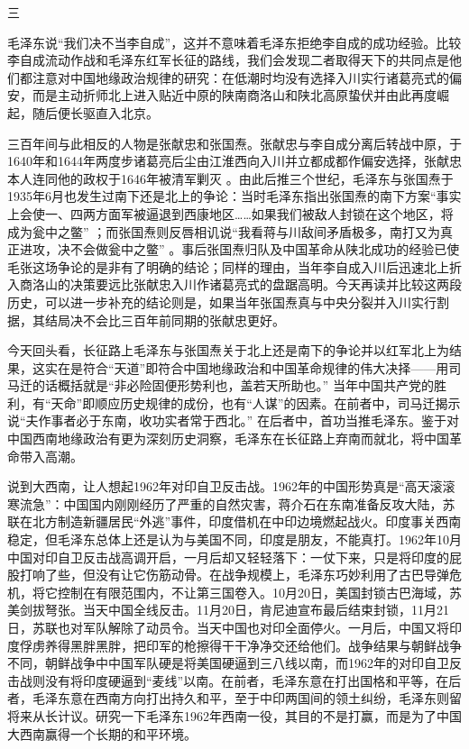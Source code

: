 \documentclass[UTF8, 12pt, a4paper]{ctexrep}
\begin{document}
三

毛泽东说“我们决不当李自成”，这并不意味着毛泽东拒绝李自成的成功经验。比较李自成流动作战和毛泽东红军长征的路线，我们会发现二者取得天下的共同点是他们都注意对中国地缘政治规律的研究：在低潮时均没有选择入川实行诸葛亮式的偏安，而是主动折师北上进入贴近中原的陕南商洛山和陕北高原蛰伏并由此再度崛起，随后便长驱直入北京。

三百年间与此相反的人物是张献忠和张国焘。张献忠与李自成分离后转战中原，于1640年和1644年两度步诸葛亮后尘由江淮西向入川并立都成都作偏安选择，张献忠本人连同他的政权于1646年被清军剿灭 。由此后推三个世纪，毛泽东与张国焘于1935年6月也发生过南下还是北上的争论：当时毛泽东指出张国焘的南下方案“事实上会使一、四两方面军被逼退到西康地区……如果我们被敌人封锁在这个地区，将成为瓮中之鳖” ；而张国焘则反唇相讥说“我看蒋与川敌间矛盾极多，南打又为真正进攻，决不会做瓮中之鳖” 。事后张国焘归队及中国革命从陕北成功的经验已使毛张这场争论的是非有了明确的结论；同样的理由，当年李自成入川后迅速北上折入商洛山的决策要远比张献忠入川作诸葛亮式的盘踞高明。今天再读并比较这两段历史，可以进一步补充的结论则是，如果当年张国焘真与中央分裂并入川实行割据，其结局决不会比三百年前同期的张献忠更好。

今天回头看，长征路上毛泽东与张国焘关于北上还是南下的争论并以红军北上为结果，这实在是符合“天道”即符合中国地缘政治和中国革命规律的伟大决择——用司马迁的话概括就是“非必险固便形势利也，盖若天所助也。” 当年中国共产党的胜利，有“天命”即顺应历史规律的成份，也有“人谋”的因素。在前者中，司马迁揭示说“夫作事者必于东南，收功实者常于西北。” 在后者中，首功当推毛泽东。鉴于对中国西南地缘政治有更为深刻历史洞察，毛泽东在长征路上弃南而就北，将中国革命带入高潮。

说到大西南，让人想起1962年对印自卫反击战。1962年的中国形势真是“高天滚滚寒流急”：中国国内刚刚经历了严重的自然灾害，蒋介石在东南准备反攻大陆，苏联在北方制造新疆居民“外逃”事件，印度借机在中印边境燃起战火。印度事关西南稳定，但毛泽东总体上还是认为与美国不同，印度是朋友，不能真打。1962年10月中国对印自卫反击战高调开启，一月后却又轻轻落下：一仗下来，只是将印度的屁股打响了些，但没有让它伤筋动骨。在战争规模上，毛泽东巧妙利用了古巴导弹危机，将它控制在有限范围内，不让第三国卷入。10月20日，美国封锁古巴海域，苏美剑拔弩张。当天中国全线反击。11月20日，肯尼迪宣布最后结束封锁，11月21日，苏联也对军队解除了动员令。当天中国也对印全面停火。一月后，中国又将印度俘虏养得黑胖黑胖，把印军的枪擦得干干净净交还给他们。战争结果与朝鲜战争不同，朝鲜战争中中国军队硬是将美国硬逼到三八线以南，而1962年的对印自卫反击战则没有将印度硬逼到“麦线”以南。在前者，毛泽东意在打出国格和平等，在后者，毛泽东意在西南方向打出持久和平，至于中印两国间的领土纠纷，毛泽东则留将来从长计议。研究一下毛泽东1962年西南一役，其目的不是打赢，而是为了中国大西南赢得一个长期的和平环境。
\end{document}
